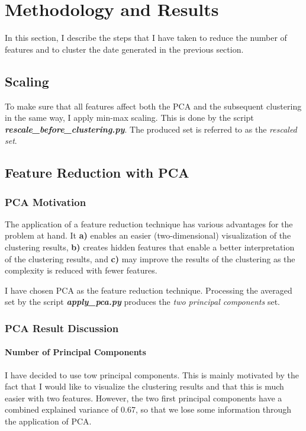 \section{Methodology and Results}
In this section, I describe the steps that I have taken to reduce the number of features and to cluster the date generated in the previous section.

\subsection{Scaling}
To make sure that all features affect both the PCA and the subsequent clustering in the same way, I apply min-max scaling. This is done by the script \textbf{\emph{rescale\_before\_clustering.py}}. The produced set is referred to as the \emph{rescaled set}.

\subsection{Feature Reduction with PCA}
\subsubsection{PCA Motivation}
The application of a feature reduction technique has various advantages for the problem at hand. It \textbf{a)} enables an easier (two-dimensional) visualization of the clustering results, \textbf{b)} creates hidden features that enable a better interpretation of the clustering results, and \textbf{c)} may improve the results of the clustering as the complexity is reduced with fewer features.

I have chosen PCA as the feature reduction technique. Processing the averaged set by the script \textbf{\emph{apply\_pca.py}} produces the \emph{two principal components} set. 

\subsubsection{PCA Result Discussion}

\paragraph{Number of Principal Components}
I have decided to use tow principal components. This is mainly motivated by the fact that I would like to visualize the clustering results and that this is much easier with two features. However, the two first principal components have a combined explained variance of 0.67, so that we lose some information through the application of PCA. 

